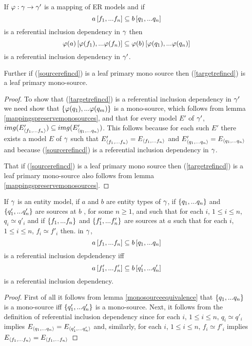 \begin{lemma}
If $\varphi: \gamma \rightarrow \gamma'$ is a mapping of ER models and
if 
\begin{equation}
\label{sourcerefincd}
a\left[f_1,...f_n\right]\subseteq b\left[q_1,...q_n\right]
\end{equation}
is a referential inclusion dependency in $\gamma$ then  
\begin{equation}
\label{targetrefincd}
\varphi(a)\left[\varphi(f_1),...\varphi(f_n)\right]\subseteq\varphi(b)\left[\varphi(q_1),...\varphi(q_n)\right]
\end{equation}
is a referential inclusion dependency in $\gamma'$. 

Further if (\ref{sourcerefincd}) is a leaf primary mono source then (\ref{targetrefincd}) is a leaf primary mono-source.
\end{lemma}
\begin{proof}
To show that (\ref{targetrefincd}) is a referential inclusion dependency
 in $\gamma'$ we need show that $\left\{\varphi(q_1),...\varphi(q_m)\right\}$ is a mono-source, which follows from lemma \ref{mappingspreservemonosources}, and that for every model $E'$ of $\gamma'$, 
$img(E'_{\langle f_1,...f_n\rangle}) \subseteq img(E'_{\langle q_1,...q_n\rangle})$. 
This follows because for each such $E'$ there exists a model $E$ of $\gamma$ such that 
$E'_{\langle f_1,...f_n\rangle}=E_{\langle f_1,...f_n\rangle}$ and $E'_{\langle q_1,...q_n\rangle}=E_{\langle q_1,...q_n\rangle}$ and because 
(\ref{sourcerefincd}) is a referential inclusion dependency in $\gamma$.

That if  (\ref{sourcerefincd}) is a leaf primary mono source then (\ref{targetrefincd}) is a leaf primary mono-source also follows from lemma \ref{mappingspreservemonosources}.
\end{proof}

\begin{lemma}
If $\gamma$ is an entity model, 
if $a$ and $b$ are entity types of  $\gamma$,  if $\left\{q_1,...q_n\right\}$
and $\left\{q'_1,...q'_n\right\}$ are sources at $b$ , for some $n \geq 1$,
and such that for each $i$, $1 \leq i \leq n$, $q_i \simeq q'_i$  
and if $\left\{f_1,...f_n\right\}$ and $\left\{f'_1,...f'_n\right\}$ are sources at $a$
such that for each $i$, $1 \leq i \leq n$, $f_i \simeq f'_i$
then. in $\gamma$, 
\begin{equation}
\label{incdequivalence1}
a\left[f_1,...f_n\right]\subseteq b\left[q_1,...q_n\right]
\end{equation}
is a referential inclusion depdendency iff
\begin{equation}
\label{incdequivalence2}
a\left[f'_1,...f'_n\right]\subseteq b\left[q'_1,...q'_n\right]
\end{equation}
is a referential inclusion dependency.

\end{lemma}
\begin{proof}
First of all it follows from lemma \ref{monosourceequivalence} that $\left\{q_1,...q_n\right\}$ is a mono-source iff
$\left\{q'_1,...q'_n\right\}$ is a mono-source.
Next, it follows from the definition of referential inclusion dependency
 since for each $i$, $1 \leq i \leq n$, $q_i \simeq q'_i$  implies $E_{\langle q_1,...q_n\rangle} =
E_{\langle q'_1,...q'_n\rangle}$ and,
similarly, for each $i$, $1 \leq i \leq n$, $f_i \simeq f'_i$  implies $E_{\langle f_1,...f_n\rangle} =
E_{\langle f_1,...f_n\rangle}$
\end{proof}

